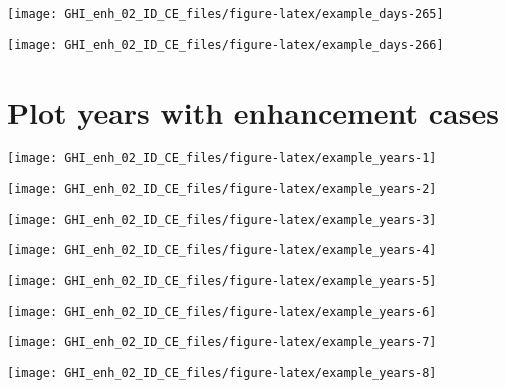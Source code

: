 \documentclass[
  10pt,
  a4paper,oneside]{article}
\begin{document}
\begin{center}\texttt{[image: GHI\_enh\_02\_ID\_CE\_files/figure-latex/example\_days-265]} \end{center}

\begin{center}\texttt{[image: GHI\_enh\_02\_ID\_CE\_files/figure-latex/example\_days-266]} \end{center}

\newpage
\FloatBarrier

\hypertarget{plot-years-with-enhancement-cases}{%
\section{Plot years with enhancement cases}\label{plot-years-with-enhancement-cases}}

\begin{center}\texttt{[image: GHI\_enh\_02\_ID\_CE\_files/figure-latex/example\_years-1]} \end{center}

\begin{center}\texttt{[image: GHI\_enh\_02\_ID\_CE\_files/figure-latex/example\_years-2]} \end{center}

\begin{center}\texttt{[image: GHI\_enh\_02\_ID\_CE\_files/figure-latex/example\_years-3]} \end{center}

\begin{center}\texttt{[image: GHI\_enh\_02\_ID\_CE\_files/figure-latex/example\_years-4]} \end{center}

\begin{center}\texttt{[image: GHI\_enh\_02\_ID\_CE\_files/figure-latex/example\_years-5]} \end{center}

\begin{center}\texttt{[image: GHI\_enh\_02\_ID\_CE\_files/figure-latex/example\_years-6]} \end{center}

\begin{center}\texttt{[image: GHI\_enh\_02\_ID\_CE\_files/figure-latex/example\_years-7]} \end{center}

\begin{center}\texttt{[image: GHI\_enh\_02\_ID\_CE\_files/figure-latex/example\_years-8]} \end{center}
\end{document}
